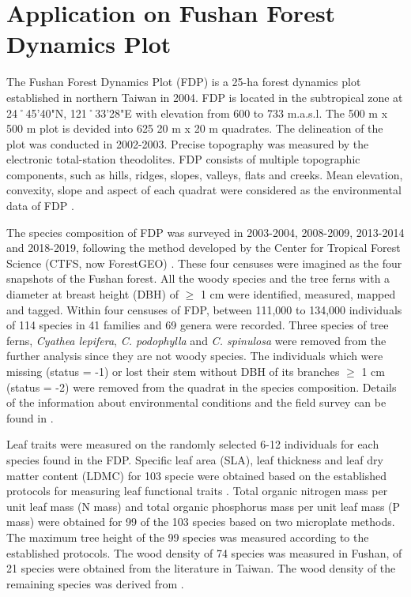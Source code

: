 	\section{Application on Fushan Forest Dynamics Plot}
	\noindent
	The Fushan Forest Dynamics Plot (FDP) is a 25-ha forest dynamics plot established in northern Taiwan in 2004. FDP is located in the subtropical zone at 24˚45'40"N, 121˚33'28"E with elevation from 600 to 733 m.a.s.l. The 500 m x 500 m plot is devided into 625 20 m x 20 m quadrates. The delineation of the plot was conducted in 2002-2003. Precise topography was measured by the electronic total-station theodolites. FDP consists of multiple topographic components, such as hills, ridges, slopes, valleys, flats and creeks. Mean elevation, convexity, slope and aspect of each quadrat were considered as the environmental data of FDP \citep{su2007fushan}. 
	
	The species composition of FDP was surveyed in 2003-2004, 2008-2009, 2013-2014 and 2018-2019, following the method developed by the Center for Tropical Forest Science (CTFS, now ForestGEO) \citep{condit1998tropical}. These four censuses were imagined as the four snapshots of the Fushan forest. All the woody species and the tree ferns with a diameter at breast height (DBH) of $\geq$ 1 cm were identified, measured, mapped and tagged. Within four censuses of FDP, between 111,000 to 134,000 individuals of 114 species in 41 families and 69 genera were recorded. Three species of tree ferns, \textit{Cyathea lepifera}, \textit{C. podophylla} and \textit{C. spinulosa} were removed from the further analysis since they are not woody species. The individuals which were missing (status = -1) or lost their stem without DBH of its branches $\geq$ 1 cm (status = -2) were removed from the quadrat in the species composition. Details of the information about environmental conditions and the field survey can be found in \citet{su2007fushan}.
	
	Leaf traits were measured on the randomly selected 6-12 individuals for each species found in the FDP. Specific leaf area (SLA), leaf thickness and leaf dry matter content (LDMC) for 103 specie were obtained based on the established protocols for measuring leaf functional traits \citep{hrguindeguy2013new}. Total organic nitrogen mass per unit leaf mass (N mass) and total organic phosphorus mass per unit leaf mass (P mass) were obtained for 99 of the 103 species based on two microplate methods. The maximum tree height of the 99 species was measured according to the established protocols. The wood density of 74 species was measured in Fushan, of 21 species were obtained from the literature in Taiwan. The wood density of the remaining species was derived from \citet{chave2009towards}.
	
